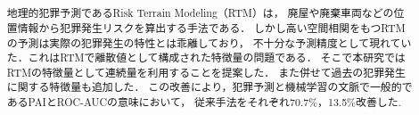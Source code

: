 \usepackage{color}
\usepackage{url}
\usepackage{doi}
\usepackage{lmodern}
\usepackage{amsmath}
\usepackage{mathtools}
\usepackage{amsthm}
\usepackage{amssymb}
\usepackage{booktabs}
\usepackage[dvipdfmx]{graphicx}
\usepackage{listings}
\usepackage{float} 
\usepackage{placeins}
\usepackage[nameinlink]{cleveref}
\usepackage{subcaption}

\newcommand{\yj}[1]{{#1}^{(\lambda)}}
\newcommand{\yjj}[1]{{#1}^{(\lambda_j)}}
\newcommand{\yjs}[1]{{#1}^{(\lambda*)}}
\newcommand{\tr}[1]{{#1}^\top}
\newcommand{\yjv}{\xi}
\newcommand{\real}{\mathbb{R}}
\newcommand{\cfsq}{$\text{CF}^2$}

\title{
}


\author{%
\and
{}
}



\begin{abstract}
地理的犯罪予測であるRisk Terrain Modeling（RTM）は，
廃屋や廃棄車両などの位置情報から犯罪発生リスクを算出する手法である．
しかし高い空間相関をもつRTMの予測は実際の犯罪発生の特性とは乖離しており，
不十分な予測精度として現れていた．これはRTMで離散値として構成された特徴量の問題である．
そこで本研究ではRTMの特徴量として連続量を利用することを提案した．
また併せて過去の犯罪発生に関する特徴量も追加した．
この改善により，犯罪予測と機械学習の文脈で一般的であるPAIとROC-AUCの意味において，
従来手法をそれぞれ70.7\%，13.5\%改善した. 
\end{abstract}


\def\Style{``jsaiac.sty''}
\def\BibTeX{{\rm B\kern-.05em{\sc i\kern-.025em b}\kern-.08em%
 T\kern-.1667em\lower.7ex\hbox{E}\kern-.125emX}}
\def\JBibTeX{\leavevmode\lower .6ex\hbox{J}\kern-0.15em\BibTeX}
\def\LaTeXe{\LaTeX\kern.15em2$_{\textstyle\varepsilon}$}


